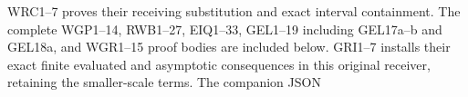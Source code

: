 WRC1--7 proves their receiving substitution and exact interval
containment. The complete WGP1--14, RWB1--27, EIQ1--33,
GEL1--19 including GEL17a--b and GEL18a, and WGR1--15
proof bodies are included below. GRI1--7 installs their exact
finite evaluated and asymptotic consequences in this original
receiver, retaining the smaller-scale terms. The companion JSON